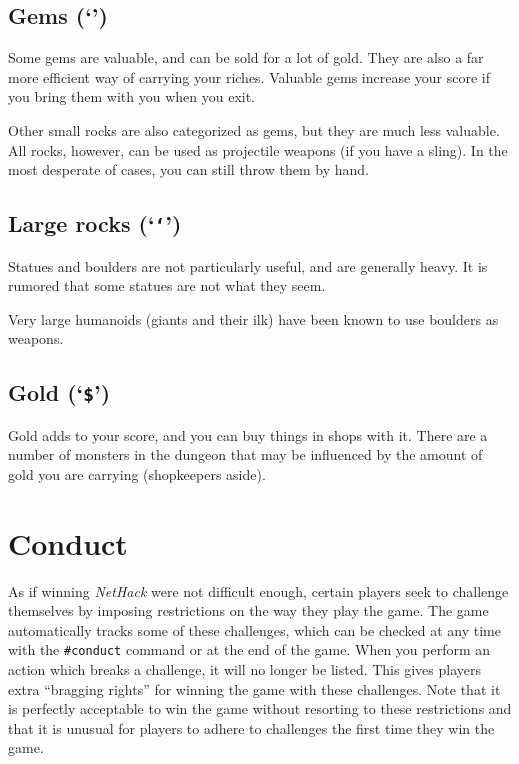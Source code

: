 \subsection*{Gems (`{\tt *}')}

Some gems are valuable, and can be sold for a lot of gold.  They are also
a far more efficient way of carrying your riches.  Valuable gems increase
your score if you bring them with you when you exit.

Other small rocks are also categorized as gems, but they are much less
valuable.  All rocks, however, can be used as projectile weapons (if you
have a sling).  In the most desperate of cases, you can still throw them
by hand.

\subsection*{Large rocks (`{\tt `}')}
Statues and boulders are not particularly useful, and are generally
heavy.  It is rumored that some statues are not what they seem.

Very large humanoids (giants and their ilk) have been known to use boulders
as weapons.

\subsection*{Gold (`{\tt \$}')}

Gold adds to your score, and you can buy things in shops with it.
There are a number
of monsters in the dungeon that may be influenced by the amount of gold
you are carrying (shopkeepers aside).

\section{Conduct}

As if winning {\it NetHack\/} were not difficult enough, certain players
seek to challenge themselves by imposing restrictions on the
way they play the game.  The game automatically tracks some of
these challenges, which can be checked at any time with the {\tt \#conduct}
command or at the end of the game.  When you perform an action which
breaks a challenge, it will no longer be listed.  This gives
players extra ``bragging rights'' for winning the game with these
challenges.  Note that it is perfectly acceptable to win the game
without resorting to these restrictions and that it is unusual for
players to adhere to challenges the first time they win the game.


